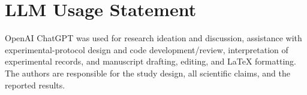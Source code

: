 \documentclass[10pt,twocolumn,letterpaper]{article}
\begin{document}
\section*{LLM Usage Statement}
OpenAI ChatGPT was used for research ideation and discussion, assistance with experimental-protocol design and code development/review, interpretation of experimental records, and manuscript drafting, editing, and LaTeX formatting. The authors are responsible for the study design, all scientific claims, and the reported results.


{\small


}
\end{document}
